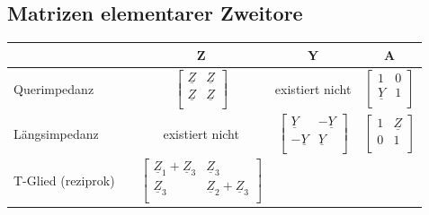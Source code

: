 \begin{table}
	\subsection{Matrizen elementarer Zweitore}
	\renewcommand{\arraystretch}{0.9}
		\begin{tabular}{|l | c | c | c | c|}
			\hline
				&
				& \textbf{Z} 
				& \textbf{Y}
				& \textbf{A}\\
			\hline
				Querimpedanz
				& 
				\parbox{2.3cm}{}
				 & $
				\begin{bmatrix} \underline{Z} & \underline{Z} \\
						\underline{Z} & \underline{Z} \\
					\end{bmatrix}$
				& existiert nicht
				& $ \begin{bmatrix}
						1 & 0 \\
						\underline{Y} & 1 \\
					\end{bmatrix}$\\
			\hline
				Längsimpedanz
				& \parbox{2.6cm}{}
				& existiert nicht
				& $ \begin{bmatrix}
						\underline{Y} & -\underline{Y} \\
						-\underline{Y} & \underline{Y} \\
					\end{bmatrix}$
				& $ \begin{bmatrix}
						1 & \underline{Z} \\
						0 & 1 \\
					\end{bmatrix}$\\
			\hline
				T-Glied (reziprok)
				& \parbox{2.6cm}{}
				& $ \begin{bmatrix}
						\underline{Z}_{1}+\underline{Z}_{3} & \underline{Z}_{3} \\
						\underline{Z}_{3} & \underline{Z}_{2}+\underline{Z}_{3} \\
					\end{bmatrix}$
				  \hspace{0.5cm}\parbox[c][1.5cm]{2.5cm}{
				   $\underline{Z}_{1} = \underline{Z}_{11} - \underline{Z}_{12}$\\
				   $\underline{Z}_{2} = \underline{Z}_{22} - \underline{Z}_{12}$\\
				   $\underline{Z}_{3} = \underline{Z}_{12} = \underline{Z}_{21}$
}
\end{tabular}
\end{table}
